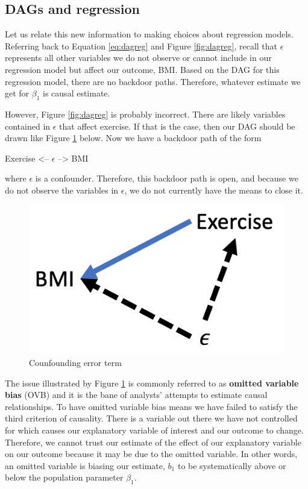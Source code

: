 \documentclass[
]{book}
\begin{document}
\hypertarget{dags-and-regression}{%
\subsection{DAGs and regression}\label{dags-and-regression}}

Let us relate this new information to making choices about regression models. Referring back to Equation \eqref{eq:dagreg} and Figure \ref{fig:dagreg}, recall that \(\epsilon\) represents all other variables we do not observe or cannot include in our regression model but affect our outcome, BMI. Based on the DAG for this regression model, there are no backdoor paths. Therefore, whatever estimate we get for \(\beta_1\) is causal estimate.

However, Figure \ref{fig:dagreg} is probably incorrect. There are likely variables contained in \(\epsilon\) that affect exercise. If that is the case, then our DAG should be drawn like Figure \ref{fig:dagregovb} below. Now we have a backdoor path of the form

Exercise \textless-- \(\epsilon\) --\textgreater{} BMI

where \(\epsilon\) is a confounder. Therefore, this backdoor path is open, and because we do not observe the variables in \(\epsilon\), we do not currently have the means to close it.

\begin{figure}

{\centering \includegraphics[width=\textwidth]{images/dag_regovb} 

}

\caption{Counfounding error term}\label{fig:dagregovb}
\end{figure}

The issue illustrated by Figure \ref{fig:dagregovb} is commonly referred to as \textbf{omitted variable bias} (OVB) and it is the bane of analysts' attempts to estimate causal relationships. To have omitted variable bias means we have failed to satisfy the third criterion of causality. There is a variable out there we have not controlled for which causes our explanatory variable of interest and our outcome to change. Therefore, we cannot trust our estimate of the effect of our explanatory variable on our outcome because it may be due to the omitted variable. In other words, an omitted variable is biasing our estimate, \(b_1\) to be systematically above or below the population parameter \(\beta_1\).
\end{document}
